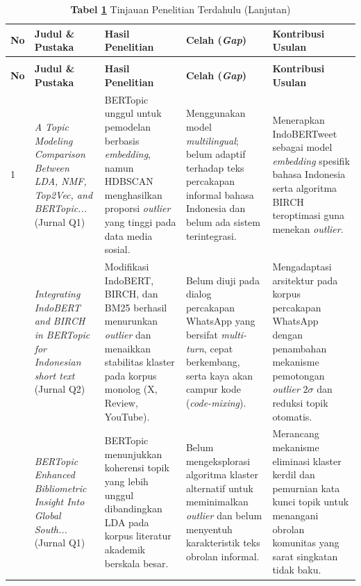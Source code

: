 \begingroup
\pagestyle{fancy}
\singlespacing
\setlength{\extrarowheight}{3pt}
\setlength{\LTpre}{0pt}
\setlength{\LTpost}{4pt}

\begin{scriptsize}
	\begin{longtable}{>{\centering\arraybackslash}p{0.4cm} p{2.6cm} p{2.9cm} p{2.9cm} p{3.0cm}}

		\caption{Tinjauan Penelitian Terdahulu} \label{tab:tinjauan} \\[4pt]
		\hline
		\textbf{No} & \textbf{Judul \& Pustaka} & \textbf{Hasil Penelitian} & \textbf{Celah (\textit{Gap})} & \textbf{Kontribusi Usulan} \\
		\hline
		\endfirsthead

		\caption*{\textbf{Tabel \ref{tab:tinjauan}} Tinjauan Penelitian Terdahulu (Lanjutan)} \\[4pt]
		\hline
		\textbf{No} & \textbf{Judul \& Pustaka} & \textbf{Hasil Penelitian} & \textbf{Celah (\textit{Gap})} & \textbf{Kontribusi Usulan} \\
		\hline
		\endhead

		\hline
		\endfoot

		\hline
		\endlastfoot

		1 &
		\textit{A Topic Modeling Comparison Between LDA, NMF, Top2Vec, and BERTopic...} \citep{10.3389/fsoc.2022.886498} (Jurnal Q1) &
		BERTopic unggul untuk pemodelan berbasis \textit{embedding}, namun HDBSCAN menghasilkan proporsi \textit{outlier} yang tinggi pada data media sosial. &
		Menggunakan model \textit{multilingual}; belum adaptif terhadap teks percakapan informal bahasa Indonesia dan belum ada sistem terintegrasi. &
		Menerapkan IndoBERTweet sebagai model \textit{embedding} spesifik bahasa Indonesia serta algoritma BIRCH teroptimasi guna menekan \textit{outlier}. \\
		\hline
		2 &
		\textit{Integrating IndoBERT and BIRCH in BERTopic for Indonesian short text} \citep{iaes2025indobert} (Jurnal Q2) &
		Modifikasi IndoBERT, BIRCH, dan BM25 berhasil menurunkan \textit{outlier} dan menaikkan stabilitas klaster pada korpus monolog (X, Review, YouTube). &
		Belum diuji pada dialog percakapan WhatsApp yang bersifat \textit{multi-turn}, cepat berkembang, serta kaya akan campur kode (\textit{code-mixing}). &
		Mengadaptasi arsitektur pada korpus percakapan WhatsApp dengan penambahan mekanisme pemotongan \textit{outlier} $2\sigma$ dan reduksi topik otomatis. \\
		\hline
		3 &
		\textit{BERTopic Enhanced Bibliometric Insight Into Global South...} \citep{10643545} (Jurnal Q1) &
		BERTopic menunjukkan koherensi topik yang lebih unggul dibandingkan LDA pada korpus literatur akademik berskala besar. &
		Belum mengeksplorasi algoritma klaster alternatif untuk meminimalkan \textit{outlier} dan belum menyentuh karakteristik teks obrolan informal. &
		Merancang mekanisme eliminasi klaster kerdil dan pemurnian kata kunci topik untuk menangani obrolan komunitas yang sarat singkatan tidak baku. \\
	\end{longtable}
\end{scriptsize}
\setlength{\extrarowheight}{0pt}
\endgroup
